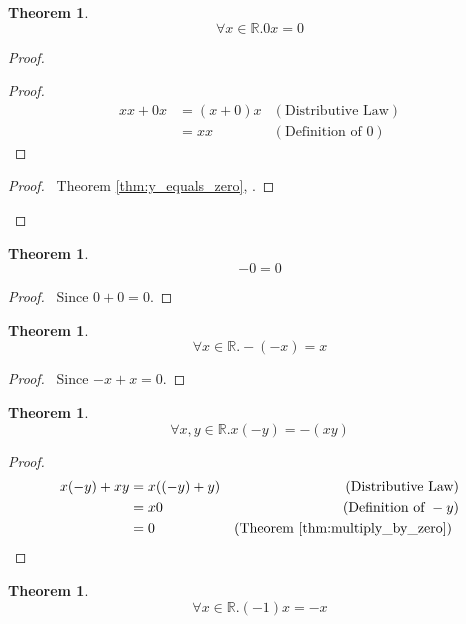 \documentclass{book}
\let\qed\relax
\newtheorem{thm}[ax]{Theorem}
\theoremstyle{definition}
\begin{document}
\begin{thm}
\label{thm:multiply_by_zero}
\[ \forall x \in \mathbb{R}. 0x = 0 \]
\end{thm}

\begin{proof}
\pf
{}
\begin{proof}
	\pf
	\begin{align*}
		xx + 0x & = (x + 0) x & (\text{Distributive Law}) \\
		& = xx & (\text{Definition of } 0)
	\end{align*}
\end{proof}
\begin{proof}
	\pf\ Theorem \ref{thm:y_equals_zero}, .
\end{proof}
\qed
\end{proof}

\begin{thm}
\[ -0 = 0 \]
\end{thm}

\begin{proof}
\pf\ Since $0 + 0 = 0$. \qed
\end{proof}

\begin{thm}
\label{thm:minus_minus}
\[ \forall x \in \mathbb{R}. -(-x) = x \]
\end{thm}

\begin{proof}
\pf\ Since $-x + x = 0$. \qed
\end{proof}

\begin{thm}
\label{thm:multiply_by_negative}
\[ \forall x,y \in \mathbb{R}. x(-y) = -(xy) \]
\end{thm}

\begin{proof}
\pf
\begin{align*}
x(-y) + xy & = x((-y)+y) & (\text{Distributive Law}) \\
& = x0 & (\text{Definition of } -y) \\
& = 0 & (\text{Theorem \ref{thm:multiply_by_zero}}) \enspace \qed
\end{align*}
\end{proof}

\begin{thm}
\label{thm:multiply_by_minus_one}
\[ \forall x \in \mathbb{R}. (-1)x = -x \]
\end{thm}
\end{document}
